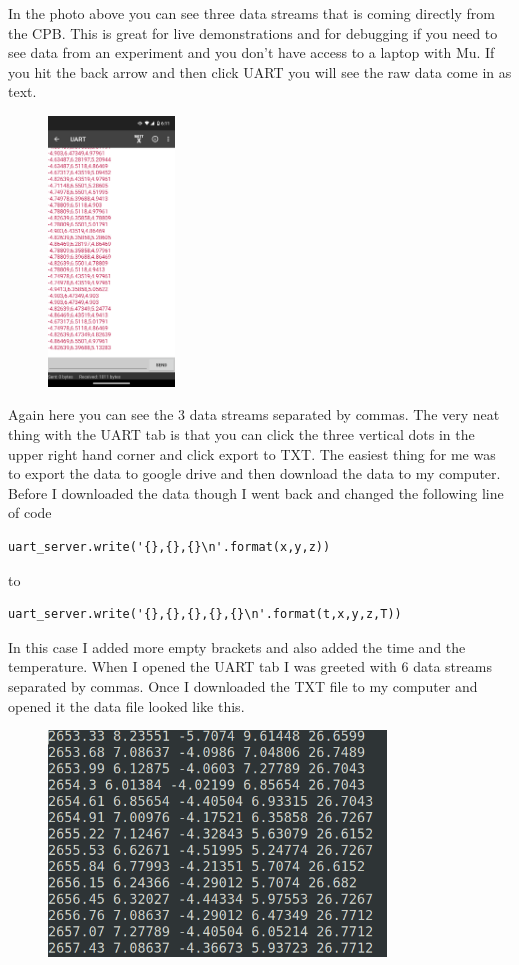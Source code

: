 In the photo above you can see three data streams that is coming directly from the CPB. This is great for live demonstrations and for debugging if you need to see data from an experiment and you don't have access to a laptop with Mu. If you hit the back arrow and then click UART you will see the raw data come in as text.
\begin{figure}[H]
  \begin{center}
    \includegraphics[width=0.3\textwidth]{Figures/phoneapp4.png}
  \end{center}
\end{figure}
Again here you can see the 3 data streams separated by commas. The very neat thing with the UART tab is that you can click the three vertical dots in the upper right hand corner and click export to TXT. The easiest thing for me was to export the data to google drive and then download the data to my computer. Before I downloaded the data though I went back and changed the following line of code
\begin{verbatim}
uart_server.write('{},{},{}\n'.format(x,y,z))
\end{verbatim}
to 
\begin{verbatim}
uart_server.write('{},{},{},{},{}\n'.format(t,x,y,z,T))
\end{verbatim}
In this case I added more empty brackets and also added the time and the temperature. When I opened the UART tab I was greeted with 6 data streams separated by commas. Once I downloaded the TXT file to my computer and opened it the data file looked like this.
\begin{figure}[H]
  \begin{center}
    \includegraphics[width=0.8\textwidth]{Figures/csv_fileapp.png}
  \end{center}
\end{figure}
